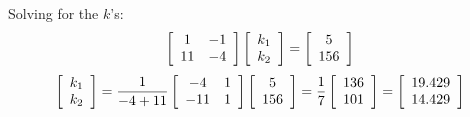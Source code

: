  

Solving for the $k$'s:
\[
\left[ {\begin{array}{*{20}c}
   1 & { - 1}  \\
   {11} & { - 4}  \\
\end{array}} \right]\left[ {\begin{array}{*{20}c}
   {k_1 }  \\
   {k_2 }  \\
\end{array}} \right] = \left[ {\begin{array}{*{20}c}
   5  \\
   {156}  \\
\end{array}} \right]
\]
\[
\left[ {\begin{array}{*{20}c}
   {k_1 }  \\
   {k_2 }  \\
\end{array}} \right] = \frac{1}{{ - 4 + 11}}\left[ {\begin{array}{*{20}c}
   { - 4} & 1  \\
   { - 11} & 1  \\
\end{array}} \right]\left[ {\begin{array}{*{20}c}
   5  \\
   {156}  \\
\end{array}} \right] = \frac{1}{7}\left[ {\begin{array}{*{20}c}
   {136}  \\
   {101}  \\
\end{array}} \right] = \left[ {\begin{array}{*{20}c}
   {19.429}  \\
   {14.429}  \\
\end{array}} \right]
\]

